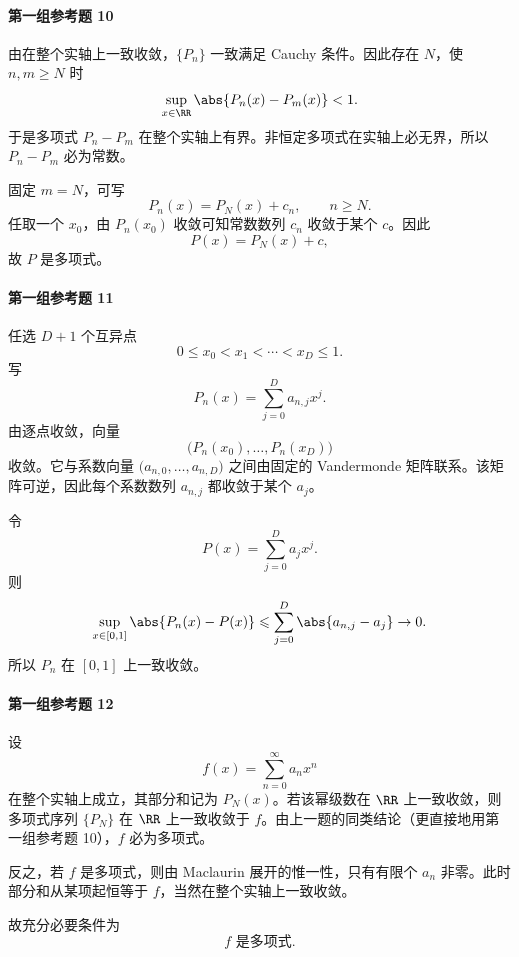 \paragraph{第一组参考题 10}
\begin{xsolution}
由在整个实轴上一致收敛，$\{P_n\}$ 一致满足 Cauchy 条件。因此存在 $N$，使 $n,m\geqslant N$ 时
\[
  \sup_{x\in\RR}\abs{P_n(x)-P_m(x)}<1.
\]
于是多项式 $P_n-P_m$ 在整个实轴上有界。非恒定多项式在实轴上必无界，所以 $P_n-P_m$ 必为常数。

固定 $m=N$，可写
\[
  P_n(x)=P_N(x)+c_n,
  \qquad n\geqslant N.
\]
任取一个 $x_0$，由 $P_n(x_0)$ 收敛可知常数数列 $c_n$ 收敛于某个 $c$。因此
\[
  P(x)=P_N(x)+c,
\]
故 $P$ 是多项式。
\end{xsolution}

\paragraph{第一组参考题 11}
\begin{xsolution}
任选 $D+1$ 个互异点
\[
  0\leqslant x_0<x_1<\cdots<x_D\leqslant1.
\]
写
\[
  P_n(x)=\sum_{j=0}^{D}a_{n,j}x^j.
\]
由逐点收敛，向量
\[
  \bigl(P_n(x_0),\ldots,P_n(x_D)\bigr)
\]
收敛。它与系数向量 $\bigl(a_{n,0},\ldots,a_{n,D}\bigr)$ 之间由固定的 Vandermonde 矩阵联系。该矩阵可逆，因此每个系数数列 $a_{n,j}$ 都收敛于某个 $a_j$。

令
\[
  P(x)=\sum_{j=0}^{D}a_jx^j.
\]
则
\[
  \sup_{x\in[0,1]}\abs{P_n(x)-P(x)}
  \leqslant\sum_{j=0}^{D}\abs{a_{n,j}-a_j}\to0.
\]
所以 $P_n$ 在 $[0,1]$ 上一致收敛。
\end{xsolution}

\paragraph{第一组参考题 12}
\begin{xsolution}
设
\[
  f(x)=\sum_{n=0}^{\infty}a_nx^n
\]
在整个实轴上成立，其部分和记为 $P_N(x)$。若该幂级数在 $\RR$ 上一致收敛，则多项式序列 $\{P_N\}$ 在 $\RR$ 上一致收敛于 $f$。由上一题的同类结论（更直接地用第一组参考题 10），$f$ 必为多项式。

反之，若 $f$ 是多项式，则由 Maclaurin 展开的惟一性，只有有限个 $a_n$ 非零。此时部分和从某项起恒等于 $f$，当然在整个实轴上一致收敛。

故充分必要条件为
\[
  \boxed{f\text{ 是多项式}}.
\]
\end{xsolution}

